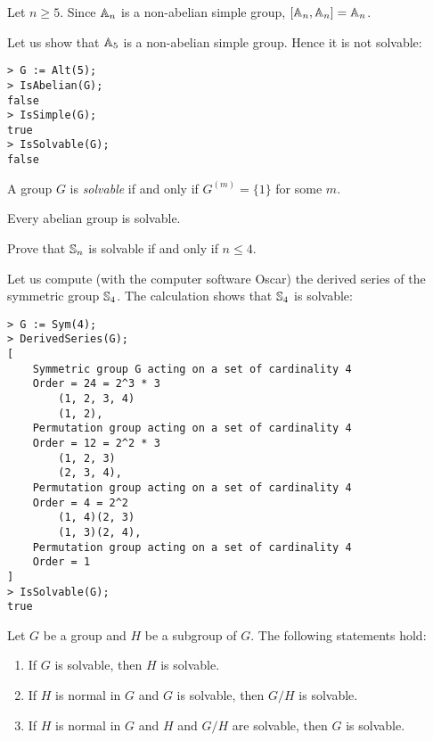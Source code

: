 \begin{example}
    Let $n\geq5$. Since $\mathbb{A}_n$ is a non-abelian simple group, 
    $[\mathbb{A}_n,\mathbb{A}_n]=\mathbb{A}_n$. 
\end{example}

Let us show that $\mathbb{A}_5$ is a non-abelian simple group. Hence
it is not solvable: 
\begin{lstlisting}
> G := Alt(5);
> IsAbelian(G);
false
> IsSimple(G);
true
> IsSolvable(G);
false
\end{lstlisting}


\begin{definition}
    A group $G$ is \emph{solvable} if and only if
    $G^{(m)}=\{1\}$ for some $m$. 
\end{definition}

Every abelian group is solvable. 

\begin{exercise}
    Prove that $\mathbb{S}_n$ is solvable if and only if $n\leq4$. 
\end{exercise}

Let us compute (with the computer software Oscar) 
the derived series of the symmetric group
$\mathbb{S}_4$. The calculation shows that $\mathbb{S}_4$ is solvable: 
\begin{lstlisting}
> G := Sym(4);
> DerivedSeries(G);
[
    Symmetric group G acting on a set of cardinality 4
    Order = 24 = 2^3 * 3
        (1, 2, 3, 4)
        (1, 2),
    Permutation group acting on a set of cardinality 4
    Order = 12 = 2^2 * 3
        (1, 2, 3)
        (2, 3, 4),
    Permutation group acting on a set of cardinality 4
    Order = 4 = 2^2
        (1, 4)(2, 3)
        (1, 3)(2, 4),
    Permutation group acting on a set of cardinality 4
    Order = 1
]
> IsSolvable(G);
true
\end{lstlisting}


\begin{proposition}
\label{pro:solvable}
    Let $G$ be a group and $H$ be a subgroup of $G$. 
    The following statements hold:
    \begin{enumerate}
        \item If $G$ is solvable, then $H$ is solvable.
        \item If $H$ is normal in $G$ and $G$ is solvable, then $G/H$ is solvable. 
        \item If $H$ is normal in $G$ and $H$ and $G/H$ are solvable, then $G$ is solvable. 
    \end{enumerate}
\end{proposition}

